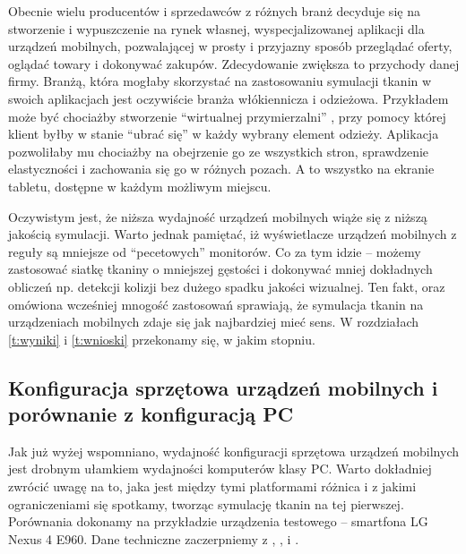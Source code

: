		Obecnie wielu producentów i sprzedawców z różnych branż decyduje się na stworzenie i wypuszczenie na rynek własnej, wyspecjalizowanej aplikacji dla urządzeń mobilnych, pozwalającej w prosty i przyjazny sposób przeglądać oferty, oglądać towary i dokonywać zakupów. Zdecydowanie zwiększa to przychody danej firmy. Branżą, która mogłaby skorzystać na zastosowaniu symulacji tkanin w swoich aplikacjach jest oczywiście branża włókiennicza i odzieżowa. Przykładem może być chociażby stworzenie ``wirtualnej przymierzalni'' \cite{tryon}, przy pomocy której klient byłby w stanie ``ubrać się'' w każdy wybrany element odzieży. Aplikacja pozwoliłaby mu chociażby na obejrzenie go ze wszystkich stron, sprawdzenie elastyczności i zachowania się go w różnych pozach. A to wszystko na ekranie tabletu, dostępne w każdym możliwym miejscu. 
		
		Oczywistym jest, że niższa wydajność urządzeń mobilnych wiąże się z niższą jakością symulacji. Warto jednak pamiętać, iż wyświetlacze urządzeń mobilnych z reguły są mniejsze od ``pecetowych'' monitorów. Co za tym idzie -- możemy zastosować siatkę tkaniny o mniejszej gęstości i dokonywać mniej dokładnych obliczeń np. detekcji kolizji bez dużego spadku jakości wizualnej. Ten fakt, oraz omówiona wcześniej mnogość zastosowań sprawiają, że symulacja tkanin na urządzeniach mobilnych zdaje się jak najbardziej mieć sens. W rozdziałach \ref{t:wyniki} i \ref{t:wnioski} przekonamy się, w jakim stopniu.
	
		\subsection{Konfiguracja sprzętowa urządzeń mobilnych i porównanie z konfiguracją PC}
		\label{t:technologie:mobilne:konfiguracja}
		
		
		Jak już wyżej wspomniano, wydajność konfiguracji sprzętowa urządzeń mobilnych jest drobnym ułamkiem wydajności komputerów klasy PC. Warto dokładniej zwrócić uwagę na to, jaka jest między tymi platformami różnica i z jakimi ograniczeniami się spotkamy, tworząc symulację tkanin na tej pierwszej. Porównania dokonamy na przykładzie urządzenia testowego -- smartfona LG Nexus 4 E960. Dane techniczne zaczerpniemy z \cite{specs}, \cite{specs_adreno}, \cite{specs_gtx750} i \cite{specs_gtxtitan}. 
		
